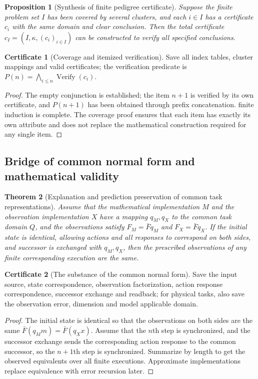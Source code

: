 \documentclass[11pt,a4paper]{article}
\theoremstyle{plain}
\newtheorem{theorem}{Theorem}[section]
\newtheorem{proposition}[theorem]{Proposition}
\theoremstyle{definition}
\newtheorem*{certificate}{Certificate}
\theoremstyle{remark}
\begin{document}
\begin{CJK*}
\begin{proposition}
[Synthesis of finite pedigree certificate]Suppose the finite problem set $I$ has been covered by several clusters, and each $i\in I$ has a certificate $c_i$ with the same domain and clear conclusion. Then the total certificate $c_I=(I,\kappa,(c_i)_{i\in I})$ can be constructed to verify all specified conclusions.\end{proposition}
\begin{certificate}
[Coverage and itemized verification]Save all index tables, cluster mappings and valid certificates; the verification predicate is $P(n)=\bigwedge_{i\le n}\operatorname{Verify}(c_i)$.\end{certificate}
\begin{proof}
The empty conjunction is established; the item $n+1$ is verified by its own certificate, and $P(n+1)$ has been obtained through prefix concatenation. finite induction is complete. The coverage proof ensures that each item has exactly its own attribute and does not replace the mathematical construction required for any single item.\end{proof}


\subsection { Bridge of common normal form and mathematical validity }

\begin{theorem}
[Explanation and prediction preservation of common task representations]\label{pc:wigner}
Assume that the mathematical implementation $M$ and the observation implementation $X$ have a mapping $q_M,q_X$ to the common task domain $Q$, and the observations satisfy $F_M=\bar Fq_M$ and $F_X=\bar Fq_X$. If the initial state is identical, allowing actions and all responses to correspond on both sides, and successor is exchanged with $q_M,q_X$, then the prescribed observations of any finite corresponding execution are the same.\end{theorem}
\begin{certificate}
[The substance of the common normal form]Save the input source, state correspondence, observation factorization, action response correspondence, successor exchange and readback; for physical tasks, also save the observation error, dimension and model applicable domain.\end{certificate}
\begin{proof}
The initial state is identical so that the observations on both sides are the same $\bar F(q_Mm)=\bar F(q_Xx)$. Assume that the $n$th step is synchronized, and the successor exchange sends the corresponding action response to the common successor, so the $n+1$th step is synchronized. Summarize by length to get the observed equivalents over all finite executions. Approximate implementations replace equivalence with error recursion later.\end{proof}



\end{CJK*}
\end{document}
